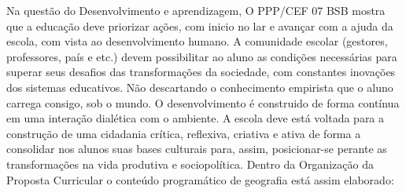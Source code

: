 Na questão do Desenvolvimento e aprendizagem, O PPP/CEF 07 BSB mostra que a educação deve priorizar ações, com inicio no lar e avançar com a ajuda da escola, com vista ao desenvolvimento humano. A comunidade escolar (gestores, professores, país e etc.) devem possibilitar ao aluno as condições necessárias para superar seus desafios das transformações da sociedade, com constantes inovações dos sistemas educativos. Não descartando o conhecimento empirista que o aluno carrega consigo, sob o mundo. O desenvolvimento é construido de forma contínua em uma interação dialética com o ambiente. A escola deve está voltada para a construção de uma cidadania crítica, reflexiva, criativa e ativa de forma a consolidar nos alunos suas bases culturais para, assim, posicionar-se perante as transformações na vida produtiva e sociopolítica. Dentro da Organização da Proposta Curricular o conteúdo programático de geografia está assim elaborado:\\

